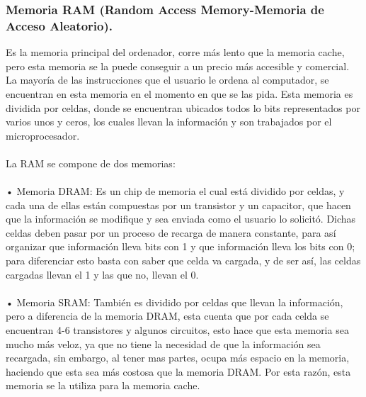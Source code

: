 \documentclass{article}
\begin{document}
\paragraph{}

\subsubsection{Memoria RAM (Random Access Memory-Memoria de Acceso Aleatorio).}


Es la memoria principal del ordenador, corre más lento que la memoria cache, pero esta memoria se la puede conseguir a un precio más accesible y comercial. La mayoría de las instrucciones que el usuario le ordena al computador, se encuentran en esta memoria en el momento en que se las pida. Esta memoria es dividida por celdas, donde se encuentran ubicados todos lo bits representados por varios unos y ceros, los cuales llevan la información y son trabajados por el microprocesador.
\paragraph{}
La RAM se compone de dos memorias:
\paragraph{}
    • Memoria DRAM: Es un chip de memoria el cual está dividido por celdas, y cada una de ellas están compuestas por un transistor y un capacitor, que hacen que la información se modifique y sea enviada como el usuario lo solicitó. Dichas celdas deben pasar por un proceso de recarga de manera constante, para así organizar que información lleva bits con 1 y que información lleva los bits con 0; para diferenciar esto basta con saber que celda va cargada, y de ser así, las celdas cargadas llevan el 1 y las que no, llevan el 0.
\paragraph{}
    • Memoria SRAM: También es dividido por celdas que llevan la información, pero a diferencia de la memoria DRAM, esta cuenta que por cada celda se encuentran 4-6 transistores y algunos circuitos, esto hace que esta memoria sea mucho más veloz, ya que no tiene la necesidad de que la información sea recargada, sin embargo, al tener mas partes, ocupa más espacio en la memoria, haciendo que esta sea más costosa que la memoria DRAM. Por esta razón, esta memoria se la utiliza para la memoria cache.
\end{document}

